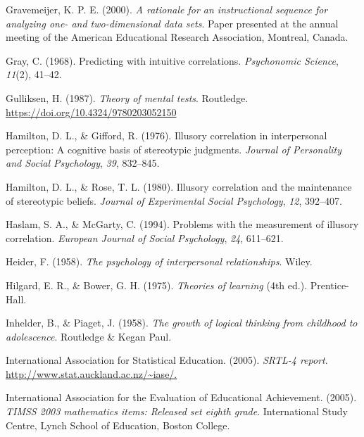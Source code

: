 \documentclass[11pt]{umnthesis}
\newlength{\cslhangindent}
\newenvironment{CSLReferences}[2] %
 {%
  \setlength{\parindent}{0pt}
  \ifodd #1 \everypar{\setlength{\hangindent}{\cslhangindent}}\ignorespaces\fi
  \ifnum #2 > 0
  \setlength{\parskip}{#2\baselineskip}
  \fi
 }%
 {}
\begin{document}
\begin{CSLReferences}{1}{0}
\leavevmode{}%
Gravemeijer, K. P. E. (2000). \emph{A rationale for an instructional sequence for analyzing one- and two-dimensional data sets}. Paper presented at the annual meeting of the {American Educational Research Association}, {M}ontreal, {C}anada.

\leavevmode{}%
Gray, C. (1968). Predicting with intuitive correlations. \emph{Psychonomic Science}, \emph{11}(2), 41--42.

\leavevmode{}%
Gulliksen, H. (1987). \emph{Theory of mental tests}. Routledge. \url{https://doi.org/10.4324/9780203052150}

\leavevmode{}%
Hamilton, D. L., \& Gifford, R. (1976). Illusory correlation in interpersonal perception: A cognitive basis of stereotypic judgments. \emph{Journal of Personality and Social Psychology}, \emph{39}, 832--845.

\leavevmode{}%
Hamilton, D. L., \& Rose, T. L. (1980). Illusory correlation and the maintenance of stereotypic beliefs. \emph{Journal of Experimental Social Psychology}, \emph{12}, 392--407.

\leavevmode{}%
Haslam, S. A., \& McGarty, C. (1994). Problems with the measurement of illusory correlation. \emph{European Journal of Social Psychology}, \emph{24}, 611--621.

\leavevmode{}%
Heider, F. (1958). \emph{The psychology of interpersonal relationships}. Wiley.

\leavevmode{}%
Hilgard, E. R., \& Bower, G. H. (1975). \emph{Theories of learning} (4th ed.). Prentice-Hall.

\leavevmode{}%
Inhelder, B., \& Piaget, J. (1958). \emph{The growth of logical thinking from childhood to adolescence}. Routledge \& Kegan Paul.

\leavevmode{}%
International Association for Statistical Education. (2005). \emph{{SRTL}-4 report}. \url{http://www.stat.auckland.ac.nz/~iase/.}

\leavevmode{}%
International Association for the Evaluation of Educational Achievement. (2005). \emph{{TIMSS} 2003 mathematics items: Released set eighth grade}. International Study Centre, Lynch School of Education, Boston College.


\end{CSLReferences}
\end{document}

